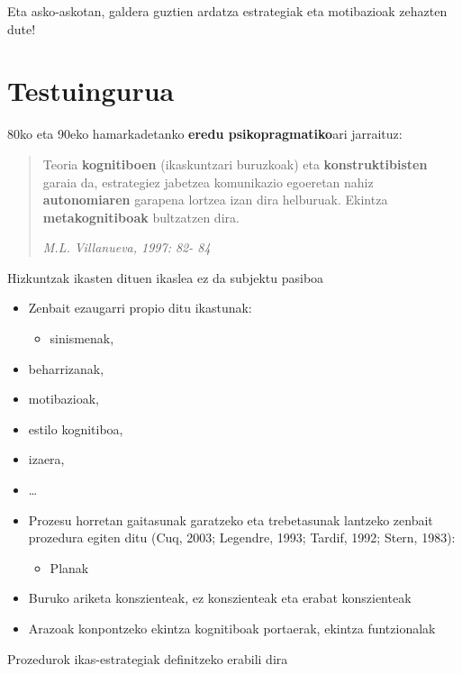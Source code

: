\documentclass[
]{book}
\providecommand{\tightlist}{%
  \setlength{\itemsep}{0pt}\setlength{\parskip}{0pt}}
\begin{document}
Eta asko-askotan, galdera guztien ardatza estrategiak eta motibazioak zehazten dute!

\hypertarget{testuingurua}{%
\section{Testuingurua}\label{testuingurua}}

80ko eta 90eko hamarkadetanko \textbf{eredu psikopragmatiko}ari jarraituz:

\begin{quote}
Teoria \textbf{kognitiboen} (ikaskuntzari buruzkoak) eta \textbf{konstruktibisten} garaia da, estrategiez jabetzea komunikazio egoeretan nahiz \textbf{autonomiaren} garapena lortzea izan dira helburuak. Ekintza \textbf{metakognitiboak} bultzatzen dira.

\emph{M.L. Villanueva, 1997: 82- 84}
\end{quote}

Hizkuntzak ikasten dituen ikaslea ez da subjektu pasiboa

\begin{itemize}
\tightlist
\item
  Zenbait ezaugarri propio ditu ikastunak:

  \begin{itemize}
  \tightlist
  \item
    sinismenak,
  \end{itemize}
\item
  beharrizanak,
\item
  motibazioak,
\item
  estilo kognitiboa,
\item
  izaera,
\item
  \ldots{}
\item
  Prozesu horretan gaitasunak garatzeko eta trebetasunak lantzeko zenbait prozedura egiten ditu (Cuq, 2003; Legendre, 1993; Tardif, 1992; Stern, 1983):

  \begin{itemize}
  \tightlist
  \item
    Planak
  \end{itemize}
\item
  Buruko ariketa konszienteak, ez konszienteak eta erabat konszienteak
\item
  Arazoak konpontzeko ekintza kognitiboak portaerak, ekintza funtzionalak
\end{itemize}

Prozedurok ikas-estrategiak definitzeko erabili dira
\end{document}
